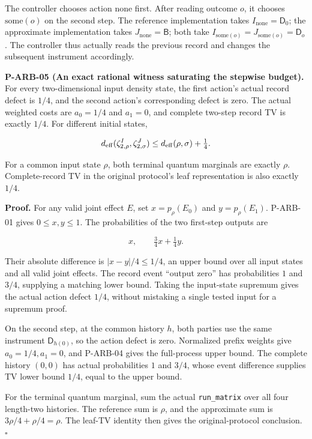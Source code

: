 \documentclass[
  11pt,
  oneside]{book}
\begin{document}
The controller chooses action \(\mathrm{none}\) first. After reading
outcome \(o\), it chooses \(\mathrm{some}(o)\) on the second step. The
reference implementation takes \(I_{\mathrm{none}}=\mathsf D_0\); the
approximate implementation takes \(J_{\mathrm{none}}=\mathsf B\); both
take \(I_{\mathrm{some}(o)}=J_{\mathrm{some}(o)}=\mathsf D_o\). The
controller thus actually reads the previous record and changes the
subsequent instrument accordingly.

\label{p-arb-05}{}

\textbf{P-ARB-05 (An exact rational witness saturating the stepwise
budget).} For every two-dimensional input density state, the first
action's actual record defect is \(1/4\), and the second action's
corresponding defect is zero. The actual weighted costs are \(a_0=1/4\)
and \(a_1=0\), and complete two-step record TV is exactly \(1/4\). For
different initial states,

\[
d_{\rm eff}(\zeta^I_{2,\rho},\zeta^J_{2,\sigma})
\le d_{\rm eff}(\rho,\sigma)+\tfrac14.
\]

For a common input state \(\rho\), both terminal quantum marginals are
exactly \(\rho\). Complete-record TV in the original protocol's leaf
representation is also exactly \(1/4\).

\textbf{Proof.} For any valid joint effect \(E\), set \(x=p_\rho(E_0)\)
and \(y=p_\rho(E_1)\). P-ARB-01 gives \(0\le x,y\le1\). The
probabilities of the two first-step outputs are

\[
x,\qquad \tfrac34x+\tfrac14y.
\]

Their absolute difference is \(|x-y|/4\le1/4\), an upper bound over all
input states and all valid joint effects. The record event ``output
zero'' has probabilities \(1\) and \(3/4\), supplying a matching lower
bound. Taking the input-state supremum gives the actual action defect
\(1/4\), without mistaking a single tested input for a supremum proof.

On the second step, at the common history \(h\), both parties use the
same instrument \(\mathsf D_{h(0)}\), so the action defect is zero.
Normalized prefix weights give \(a_0=1/4,a_1=0\), and P-ARB-04 gives the
full-process upper bound. The complete history \((0,0)\) has actual
probabilities \(1\) and \(3/4\), whose event difference supplies TV
lower bound \(1/4\), equal to the upper bound.

For the terminal quantum marginal, sum the actual \texttt{run\_\allowbreak matrix}
over all four length-two histories. The reference sum is \(\rho\), and
the approximate sum is \(3\rho/4+\rho/4=\rho\). The leaf-TV identity
then gives the original-protocol conclusion. \(\square\)
\end{document}

